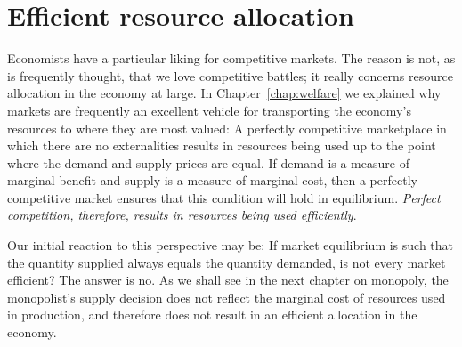 \section{Efficient resource allocation}\label{sec:ch9sec7}

Economists have a particular liking for competitive markets. The reason is
not, as is frequently thought, that we love competitive battles; it really
concerns resource allocation in the economy at large. In Chapter~\ref{chap:welfare} 
we explained why markets are frequently an excellent vehicle
for transporting the economy's resources to where they are most valued: A
perfectly competitive marketplace in which there are no externalities
results in resources being used up to the point where the demand and supply
prices are equal. If demand is a measure of marginal benefit and supply is a
measure of marginal cost, then a perfectly competitive market ensures that
this condition will hold in equilibrium. \textit{Perfect competition,
therefore, results in resources being used efficiently}.

Our initial reaction to this perspective may be: If market equilibrium is
such that the quantity supplied always equals the quantity demanded, is not
every market efficient? The answer is no. As we shall see in the next
chapter on monopoly, the monopolist's supply decision does not reflect the
marginal cost of resources used in production, and therefore does not result
in an efficient allocation in the economy.